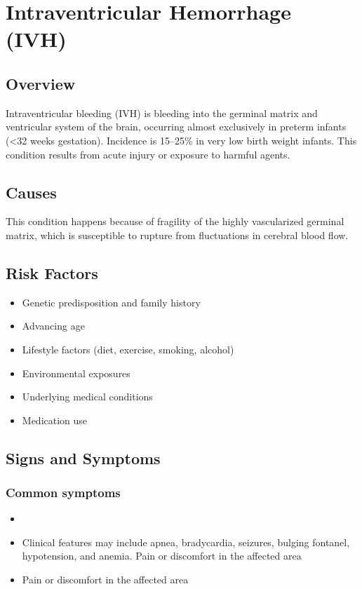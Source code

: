 \chapter{Intraventricular Hemorrhage (IVH)}
\label{sec:Intraventricular Hemorrhage}

\section{Overview}
Intraventricular bleeding (IVH) is bleeding into the germinal matrix and ventricular system of the brain, occurring almost exclusively in preterm infants (<32 weeks gestation). Incidence is 15--25\% in very low birth weight infants. This condition results from acute injury or exposure to harmful agents.
\section{Causes}
This condition happens because of fragility of the highly vascularized germinal matrix, which is susceptible to rupture from fluctuations in cerebral blood flow.     
\section{Risk Factors}

\begin{itemize}[noitemsep]
  \item Genetic predisposition and family history
  \item Advancing age
  \item Lifestyle factors (diet, exercise, smoking, alcohol)
  \item Environmental exposures
  \item Underlying medical conditions
  \item Medication use
\end{itemize}
\section{Signs and Symptoms}

\subsection{Common symptoms}
\begin{itemize}[noitemsep]
  \item \item Clinical features may include apnea, bradycardia, seizures, bulging fontanel, hypotension, and anemia. Pain or discomfort in the affected area    \item Pain or discomfort in the affected area
  \end{itemize}

